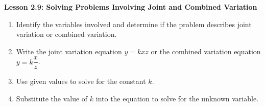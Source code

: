 \begin{center}
\textbf{Lesson 2.9: Solving Problems Involving Joint and Combined Variation}
\end{center}

\vspace*{-1.5ex}
\begin{enumerate}[noitemsep, label = \color{blue}\arabic*. ]
    \item Identify the variables involved and determine if the problem describes joint variation or combined variation.
    \item Write the joint variation equation \(y = kxz\) or the combined variation equation \(y = k \dfrac{x}{z}\).
    \item Use given values to solve for the constant \(k\).
    \item Substitute the value of \(k\) into the equation to solve for the unknown variable.
\end{enumerate}

